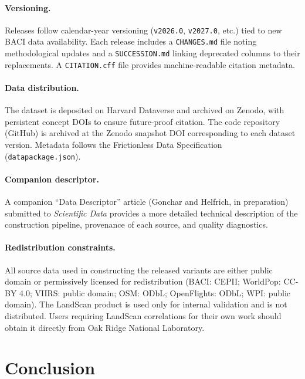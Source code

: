 \documentclass[11pt, a4paper]{article}
\begin{document}
\paragraph{Versioning.}
Releases follow calendar-year versioning (\texttt{v2026.0}, \texttt{v2027.0},
etc.) tied to new BACI data availability.  Each release includes a
\texttt{CHANGES.md} file noting methodological updates and a
\texttt{SUCCESSION.md} linking deprecated columns to their replacements.
A \texttt{CITATION.cff} file provides machine-readable citation metadata.

\paragraph{Data distribution.}
The dataset is deposited on Harvard Dataverse and archived on Zenodo, with
persistent concept DOIs to ensure future-proof citation.  The code repository
(GitHub) is archived at the Zenodo snapshot DOI corresponding to each dataset
version.  Metadata follows the Frictionless Data Specification
(\texttt{datapackage.json}).

\paragraph{Companion descriptor.}
A companion ``Data Descriptor'' article (Gonchar and Helfrich, in preparation)
submitted to \emph{Scientific Data} provides a more detailed technical
description of the construction pipeline, provenance of each source, and
quality diagnostics.

\paragraph{Redistribution constraints.}
All source data used in constructing the released variants are either public
domain or permissively licensed for redistribution (BACI: CEPII; WorldPop:
CC-BY 4.0; VIIRS: public domain; OSM: ODbL; OpenFlights: ODbL; WPI: public
domain).  The LandScan product is used only for internal validation and is
not distributed.  Users requiring LandScan correlations for their own work
should obtain it directly from Oak Ridge National Laboratory.

\section{Conclusion}
\label{sec:conclusion}
\end{document}
